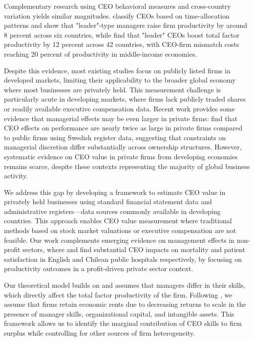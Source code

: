\documentclass[11pt,a4paper]{article}
\begin{document}
Complementary research using CEO behavioral measures and cross-country variation yields similar magnitudes. \citet{bandiera2020ceo} classify CEOs based on time-allocation patterns and show that "leader"-type managers raise firm productivity by around 8 percent across six countries, while \citet{dahlstrand2025ceo} find that "leader" CEOs boost total factor productivity by 12 percent across 42 countries, with CEO-firm mismatch costs reaching 20 percent of productivity in middle-income economies.

Despite this evidence, most existing studies focus on publicly listed firms in developed markets, limiting their applicability to the broader global economy where most businesses are privately held. This measurement challenge is particularly acute in developing markets, where firms lack publicly traded shares or readily available executive compensation data. Recent work provides some evidence that managerial effects may be even larger in private firms: \citet{quigley2022does} find that CEO effects on performance are nearly twice as large in private firms compared to public firms using Swedish register data, suggesting that constraints on managerial discretion differ substantially across ownership structures. However, systematic evidence on CEO value in private firms from developing economies remains scarce, despite these contexts representing the majority of global business activity.

We address this gap by developing a framework to estimate CEO value in privately held businesses using standard financial statement data and administrative registers—data sources commonly available in developing countries. This approach enables CEO value measurement where traditional methods based on stock market valuations or executive compensation are not feasible. Our work complements emerging evidence on management effects in non-profit sectors, where \citet{janke2024role} and \citet{munoz2024leadership} find substantial CEO impacts on mortality and patient satisfaction in English and Chilean public hospitals respectively, by focusing on productivity outcomes in a profit-driven private sector context.

Our theoretical model builds on \citet{Lucas1978-rp} and assumes that managers differ in their skills, which directly affect the total factor productivity of the firm. Following \citet{AtkesonKehoe2005JPE, McGrattan2012RED}, we assume that firms retain economic rents due to decreasing returns to scale in the presence of manager skills, organizational capital, and intangible assets. This framework allows us to identify the marginal contribution of CEO skills to firm surplus while controlling for other sources of firm heterogeneity.
\end{document}
